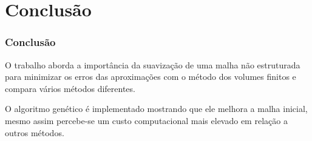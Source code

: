 \documentclass[brazil]{beamer}
\begin{document}
\section{Conclusão}
\begin{frame}
  \frametitle{Conclusão}
  O trabalho aborda a importância da suavização de uma malha não estruturada para minimizar os erros das aproximações com o método dos volumes finitos e compara vários métodos diferentes.

  O algoritmo genético é implementado mostrando que ele melhora a malha inicial, mesmo assim percebe-se um custo computacional mais elevado em relação a outros métodos.
\end{frame}
\end{document}
